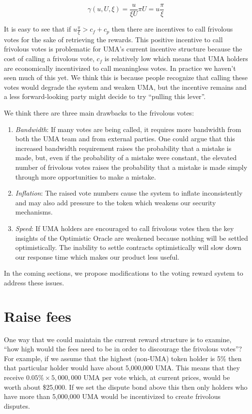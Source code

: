 \item \documentclass[12pt]{article}
\begin{document}
  $$\gamma(u, U, \xi) = \frac{u}{\xi U} \pi U = u \frac{\pi}{\xi}$$

  It is easy to see that if $u \frac{\pi}{\xi} > c_{f} + c_{p}$ then there are incentives to call frivolous votes for
  the sake of retrieving the rewards. This positive incentive to call frivolous votes is problematic for UMA's current
  incentive structure because the cost of calling a frivolous vote, $c_{f}$ is relatively low which means that UMA
  holders are economically incentivized to call meaningless votes. In practice we haven't seen much of this yet. We
  think this is because people recognize that calling these votes would degrade the system and weaken UMA, but the
  incentive remains and a less forward-looking party might decide to try ``pulling this lever''.

  We think there are three main drawbacks to the frivolous votes:

  \begin{enumerate}
    \item \textit{Bandwidth}: If many votes are being called, it requires more bandwidth from both the UMA team and
          from external parties. One could argue that this increased bandwidth requirement raises the probability
          that a mistake is made, but, even if the probability of a mistake were constant, the elevated number of
          frivolous votes raises the probability that a mistake is made simply through more opportunities to make a
          mistake.
    \item \textit{Inflation}: The raised vote numbers cause the system to inflate inconsistently and may also add
          pressure to the token which weakens our security mechanisms.
    \item \textit{Speed}: If UMA holders are encouraged to call frivolous votes then the key insights of the
          Optimistic Oracle are weakened because nothing will be settled optimistically. The inability to settle
          contracts optimistically will slow down our response time which makes our product less useful.
  \end{enumerate}

  In the coming sections, we propose modifications to the voting reward system to address these issues.


\section{Raise fees}

  One way that we could maintain the current reward structure is to examine, ``how high would the fees need to be in
  order to discourage the frivolous votes''? For example, if we assume that the highest (non-UMA) token holder is 5\%
  then that particular holder would have about 5,000,000 UMA. This means that they receive $0.05\% \times 5,000,000$
  UMA per vote which, at current prices, would be worth about \$25,000. If we set the dispute bond above this then only
  holders who have more than 5,000,000 UMA would be incentivized to create frivolous disputes.
\end{document}
